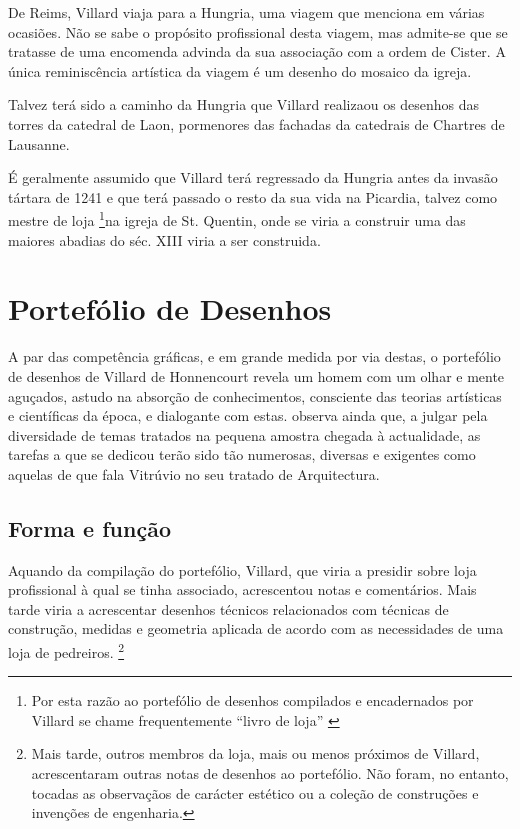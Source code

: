 \documentclass{article}
\begin{document}
De Reims, Villard viaja para a Hungria, uma viagem que menciona em
várias ocasiões. Não se sabe o propósito profissional desta viagem,
mas admite-se que se tratasse de uma encomenda advinda da sua
associação com a ordem de Cister. A única reminiscência artística da
viagem é um desenho do mosaico da igreja.

Talvez terá sido a caminho da Hungria que Villard realizaou os
desenhos das torres da catedral de Laon, pormenores das fachadas da
catedrais de Chartres de Lausanne.

É geralmente assumido \cite{teresa} que Villard terá regressado da
Hungria antes da invasão tártara de 1241 e que terá passado o resto da
sua vida na Picardia, talvez como mestre de loja \footnote{Por esta
  razão ao portefólio de desenhos compilados e encadernados por
  Villard se chame frequentemente ``livro de loja'' \cite{teresa}}na
igreja de St. Quentin, onde se viria a construir uma das maiores
abadias do séc. XIII viria a ser construida.

\section{Portefólio de Desenhos}

A par das competência gráficas, e em grande medida por via destas, o
portefólio de desenhos de Villard de Honnencourt revela um homem com
um olhar e mente aguçados, astudo na absorção de conhecimentos,
consciente das teorias artísticas e científicas da época, e dialogante
com estas. \cite{teresa} observa ainda que, a julgar pela diversidade
de temas tratados na pequena amostra chegada à actualidade, as tarefas
a que se dedicou terão sido tão numerosas, diversas e exigentes como
aquelas de que fala Vitrúvio no seu tratado de Arquitectura.

\subsection{Forma e função}

Aquando da compilação do portefólio, Villard, que viria a presidir
sobre loja profissional à qual se tinha associado, acrescentou notas e
comentários. Mais tarde viria a acrescentar desenhos técnicos
relacionados com técnicas de construção, medidas e geometria aplicada
de acordo com as necessidades de uma loja de pedreiros. \footnote{Mais
  tarde, outros membros da loja, mais ou menos próximos de Villard,
  acrescentaram outras notas de desenhos ao portefólio. Não foram, no
  entanto, tocadas as observaçãos de carácter estético ou a coleção de
  construções e invenções de engenharia.}
\end{document}
